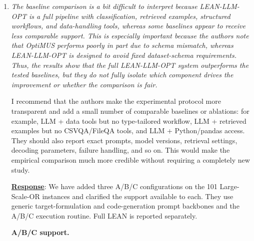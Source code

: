 \documentclass[11pt]{article}
\newcommand{\edit}[1]{{\color{hopkins-blue}\itshape #1}}
\begin{document}
\begin{enumerate}[label=(AssoE.\arabic*),leftmargin=*]
\begin{enumerate}[label=(R1.Major.\arabic*),leftmargin=*]
Automatic routing achieves 92/101 matches (91.09\%); oracle routing achieves 93/101 (92.08\%). Their net difference is one instance, or 0.99 percentage points. Routing all instances to Others gives 87/101 matches (86.14\%), five fewer than automatic routing.


\textbf{Manuscript changes.}
Section~3 now distinguishes semantic classes, execution routes, and the branch-specific data interfaces. Section~4 adds ``Routing Sensitivity,'' its classification and forced-route tables, and the above limitations. The objective-agreement table is updated, and the earlier manual EM table is explicitly labeled as a previous evaluation.


\item \edit{The baseline comparison is a bit difficult to interpret because LEAN-LLM-OPT is a full pipeline with classification, retrieved examples, structured workflows, and data-handling tools, whereas some baselines appear to receive less comparable support. This is especially important because the authors note that OptiMUS performs poorly in part due to schema mismatch, whereas LEAN-LLM-OPT is designed to avoid fixed dataset-schema requirements. Thus, the results show that the full LEAN-LLM-OPT system outperforms the tested baselines, but they do not fully isolate which component drives the improvement or whether the comparison is fair.

I recommend that the authors make the experimental protocol more transparent and add a small number of comparable baselines or ablations: for example, LLM + data tools but no type-tailored workflow, LLM + retrieved examples but no CSVQA/FileQA tools, and LLM + Python/pandas access. They should also report exact prompts, model versions, retrieval settings, decoding parameters, failure handling, and so on. This would make the empirical comparison much more credible without requiring a completely new study.}\label{R1-major-4}


\noindent\underline{\textbf{Response}}:
We have added three A/B/C configurations on the 101 Large-Scale-OR instances and clarified the support available to each. They use generic target-formulation and code-generation prompt backbones and the A/B/C execution routine. Full LEAN is reported separately.

\textbf{A/B/C support.}


\end{enumerate}
\end{enumerate}
\end{document}
